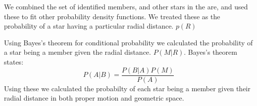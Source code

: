 \documentclass[12pt]{article}
\begin{document}
{We combined the set of identified members, and other stars in the are, and used these to fit other probability density functions.  We treated these as the probability of a star having a particular radial distance. $p(R)$ 

Using Bayes's theorem for conditional probability we calculated the probability of a star being a member given the radial distance. $P(M|R)$. Bayes's theorem states:
\begin{equation}
P(A|B)=\frac{P(B|A)P(M)}{P(A)}
\end{equation}
Using these we calculated the probabilty of each star being a member given their radial distance in both proper motion and geometric space.}
\end{document}
